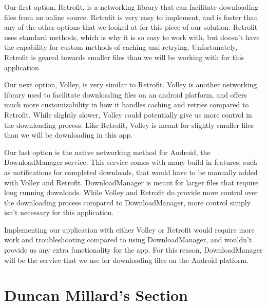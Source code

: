 \documentclass[letterpaper, 10pt,titlepage]{article}
\begin{document}
Our first option, Retrofit, is a networking library that can facilitate downloading files from an online source. Retrofit is very easy to implement, and is faster than any of the other options that we looked at for this piece of our solution. Retrofit uses standard methods, which is why it is so easy to work with, but doesn’t have the capability for custom methods of caching and retrying. Unfortunately, Retrofit is geared towards smaller files than we will be working with for this application. 


Our next option, Volley, is very similar to Retrofit. Volley is another networking library used to facilitate downloading files on an android platform, and offers much more customizability in how it handles caching and retries compared to Retrofit. While slightly slower, Volley could potentially give us more control in the downloading process. Like Retrofit, Volley is meant for slightly smaller files than we will be downloading in this app.


Our last option is the native networking method for Android, the DownloadManager service. This service comes with many build in features, such as notifications for completed downloads, that would have to be manually added with Volley and Retrofit. DownloadManager is meant for larger files that require long running downloads. While Volley and Retrofit do provide more control over the downloading process compared to DownloadManager, more control simply isn’t necessary for this application. 


Implementing our application with either Volley or Retrofit would require more work and troubleshooting compared to using DownloadManager, and wouldn’t provide us any extra functionality for the app. For this reason, DownloadManager will be the service that we use for downloading files on the Android platform. 

\vspace{0.5cm}

\section{Duncan Millard's Section}
\end{document}
